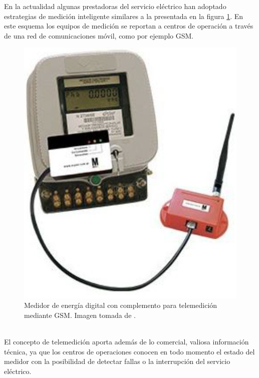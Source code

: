 En la actualidad algunas prestadoras del servicio eléctrico han adoptado estrategias de medición inteligente similares a la presentada en la figura \ref{fig:medidordigitalconcomplementogsm}. En este esquema los equipos de medición se reportan a centros de operación a través de una red de comunicaciones móvil, como por ejemplo GSM.\\
\begin{figure}[h!]
	\centering
	\includegraphics[width=0.4\linewidth]{Figures/medidor_digital_con_complemento_gsm}
	\caption{Medidor de energía digital con complemento para telemedición mediante GSM. Imagen tomada de \citep{MYEEL}.}
	\label{fig:medidordigitalconcomplementogsm}
\end{figure}\\
El concepto de telemedición aporta además de lo comercial, valiosa información técnica, ya que los centros de operaciones conocen en todo momento el estado del medidor con la posibilidad de detectar fallas o la interrupción del servicio eléctrico.\\  

